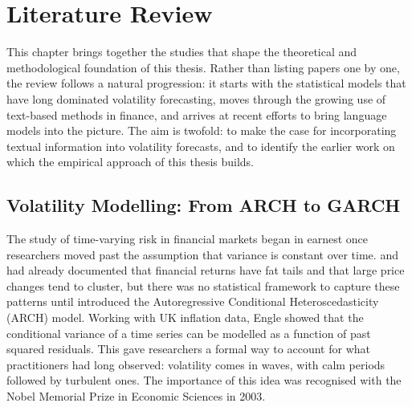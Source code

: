 \section{Literature Review}\label{sec:literature}
This chapter brings together the studies that shape the theoretical and methodological foundation of this thesis. Rather than listing papers one by one, the review follows a natural progression: it starts with the statistical models that have long dominated volatility forecasting, moves through the growing use of text-based methods in finance, and arrives at recent efforts to bring language models into the picture. The aim is twofold: to make the case for incorporating textual information into volatility forecasts, and to identify the earlier work on which the empirical approach of this thesis builds.

\subsection{Volatility Modelling: From ARCH to GARCH}\label{sec:lit-volatility}
The study of time-varying risk in financial markets began in earnest once researchers moved past the assumption that variance is constant over time. \textcite{mandelbrot1963} and \textcite{fama1965} had already documented that financial returns have fat tails and that large price changes tend to cluster, but there was no statistical framework to capture these patterns until \textcite{engle1982} introduced the Autoregressive Conditional Heteroscedasticity (ARCH) model. Working with UK inflation data, Engle showed that the conditional variance of a time series can be modelled as a function of past squared residuals. This gave researchers a formal way to account for what practitioners had long observed: volatility comes in waves, with calm periods followed by turbulent ones. The importance of this idea was recognised with the Nobel Memorial Prize in Economic Sciences in 2003.

